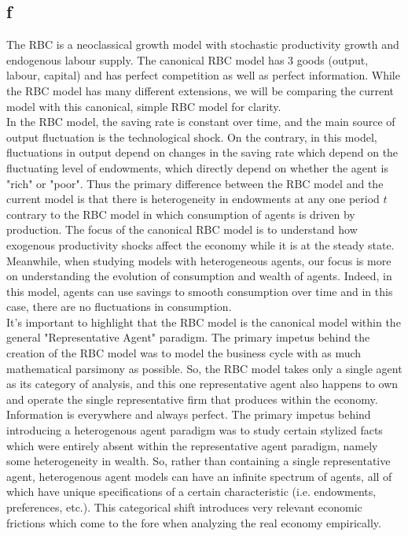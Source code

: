 \documentclass{article}
\begin{document}
\subsection{f}

The RBC is a neoclassical growth model with stochastic productivity growth and endogenous labour supply. The canonical RBC model has 3 goods (output, labour, capital) and has perfect competition as well as perfect information. While the RBC model has many different extensions, we will be comparing the current model with this canonical, simple RBC model for clarity. \\

In the RBC model, the saving rate is constant over time, and the main source of output fluctuation is the technological shock. On the contrary, in this model,  fluctuations in output depend on changes in the saving rate which depend on the fluctuating level of endowments, which directly depend on whether the agent is "rich" or "poor". Thus the primary difference between the RBC model and the current model is that there is heterogeneity in endowments at any one period $t$ contrary to the RBC model in which consumption of agents is driven by production. The focus of the canonical RBC model is to understand how exogenous productivity shocks affect the economy while it is at the steady state. Meanwhile, when studying models with heterogeneous agents, our focus is more on understanding the evolution of consumption and wealth of agents. Indeed, in this model, agents can use savings to smooth consumption over time and in this case, there are no fluctuations in consumption.\\

It's important to highlight that the RBC model is the canonical model within the general "Representative Agent" paradigm. The primary impetus behind the creation of the RBC model was to model the business cycle with as much mathematical parsimony as possible. So, the RBC model takes only a single agent as its category of analysis, and this one representative agent also happens to own and operate the single representative firm that produces within the economy. Information is everywhere and always perfect. The primary impetus behind introducing a heterogenous agent paradigm was to study certain stylized facts which were entirely absent within the representative agent paradigm, namely some heterogeneity in wealth. So, rather than containing a single representative agent, heterogenous agent models can have an infinite spectrum of agents, all of which have unique specifications of a certain characteristic (i.e. endowments, preferences, etc.). This categorical shift introduces very relevant economic frictions which come to the fore when analyzing the real economy empirically. \\
\end{document}
